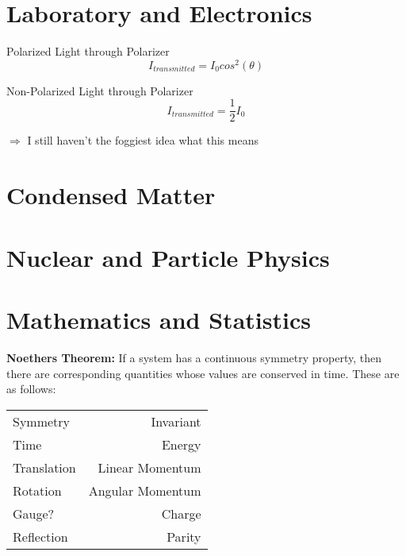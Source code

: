 \documentclass{article}
\begin{document}
\section{Laboratory and Electronics}
Polarized Light through Polarizer\begin{equation}I_{transmitted} = I_0cos^2(\theta)\end{equation}

Non-Polarized Light through Polarizer\begin{equation}I_{transmitted}=\frac{1}{2}I_0\end{equation}

$\Rightarrow$ I still haven't the foggiest idea what this means








\section{Condensed Matter}









\section{Nuclear and Particle Physics}









\section{Mathematics and Statistics}
{\bf Noethers Theorem:} If a system has a continuous symmetry property, then there are corresponding quantities whose values are conserved in time.  These are as follows:

\begin{tabular}{ l | r}
  Symmetry & Invariant\\
  Time & Energy\\
  Translation & Linear Momentum\\
  Rotation & Angular Momentum\\
  Gauge? & Charge\\
  Reflection & Parity\\
\end{tabular}
\end{document}
